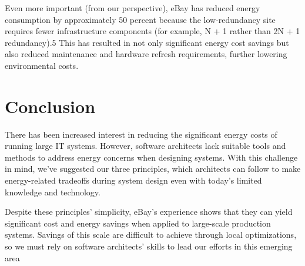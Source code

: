 Even more important (from our perspective), eBay has reduced energy consumption by approximately 50 percent because the low-redundancy site requires fewer infrastructure components (for example, N + 1 rather than 2N + 1 redundancy).5 This has resulted in not only significant energy cost savings but also reduced maintenance and hardware refresh requirements, further lowering environmental costs.

\section{Conclusion}

There has been increased interest in reducing the significant energy costs of running large IT systems. However, software architects lack suitable tools and methods to address energy concerns when designing systems. With this challenge in mind, we've suggested our three principles, which architects can follow to make energy-related tradeoffs during system design even with today's limited knowledge and technology.

Despite these principles' simplicity, eBay's experience shows that they can yield significant cost and energy savings when applied to large-scale production systems. Savings of this scale are difficult to achieve through local optimizations, so we must rely on software architects' skills to lead our efforts in this emerging area




